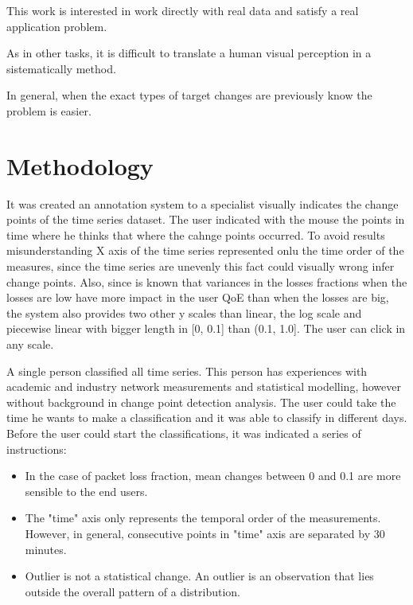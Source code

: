 This work is interested in work directly with real data and satisfy a real application problem.

As in other tasks, it is difficult to translate a human visual perception in a sistematically method.

In general, when the exact types of target changes are previously know the problem is easier.

\section{Methodology}

It was created an annotation system to a specialist visually indicates the change points of the time series dataset. The user indicated with the mouse the points in time where he thinks that where the cahnge points occurred. To avoid results misunderstanding X axis of the time series represented onlu the time order of the measures, since the time series are unevenly this fact could visually wrong infer change points. Also, since is known that variances in the losses fractions when the losses are low have more impact in the user QoE than when the losses are big, the system also provides two other y scales than linear, the log scale and piecewise linear with bigger length in [0, 0.1] than (0.1, 1.0]. The user can click in any scale.

A single person classified all time series. This person has experiences with academic and industry network measurements and statistical modelling, however without background in change point detection analysis. The user could take the time he wants to make a classification and it was able to classify in different days. Before the user could start the classifications, it was indicated a series of instructions: 

\begin{itemize}
    \item In the case of packet loss fraction, mean changes between 0 and 0.1 are more sensible to the end users.
    \item The "time" axis only represents the temporal order of the measurements. However, in general, consecutive points in "time" axis are separated by 30 minutes.
    \item Outlier is not a statistical change. An outlier is an observation that lies outside the overall pattern of a distribution.
\end{itemize}

